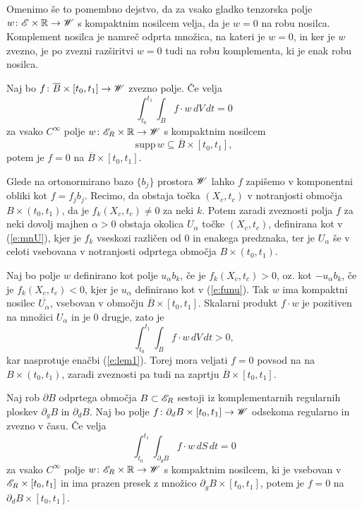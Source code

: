 Omenimo še to pomembno dejstvo, da za vsako gladko tenzorska polje $w\colon\mathscr E\times\mathbb R\to\mathscr W$ s kompaktnim
nosilcem velja, da je $w=0$ na robu nosilca. Komplement nosilca je namreč odprta množica, na kateri
je $w=0$, in ker je $w$ zvezno, je po zvezni razširitvi $w=0$ tudi na robu komplementa, ki je enak
robu nosilca.

\begin{lema}\label{l:1}
	Naj bo $f\colon\overline{B}\times [t_0,t_1]\to\mathscr W$ zvezno polje. Če velja
	\begin{equation}\label{e:lem1}
		\int_{t_0}^{t_1}\int_B f\cdot w\,dV\,dt = 0
	\end{equation}
	za vsako $C^{\infty}$ polje $w\colon\mathscr E_R\times\mathbb R\to\mathscr W$ s kompaktnim nosilcem
	\[ \mathrm{supp}\, w\subseteq \overline{B}\times[t_0,t_1], \]
	potem je $f=0$ na $\overline{B}\times [t_0,t_1]$.
\end{lema}

\proof
	Glede na ortonormirano bazo $\{b_j\}$ prostora $\mathscr W$ lahko $f$ zapišemo v komponentni obliki kot $f=f_jb_j$.
	Recimo, da obstaja točka $(X_c,t_c)$ v notranjosti območja $B\times(t_0,t_1)$, da je $f_{k}(X_c,t_c)\neq 0$
	za neki $k$. Potem zaradi zveznosti polja $f$ za neki dovolj majhen
	$\alpha > 0$ obstaja okolica $U_{\alpha}$ točke $(X_c,t_c)$, definirana kot v (\ref{e:mnU}), kjer je $f_k$
	vseskozi različen od 0 in enakega predznaka, ter
	je $U_{\alpha}$ še v celoti vsebovana v notranjosti odprtega območja $B\times(t_0,t_1)$.
	
	Naj bo polje
	$w$ definirano kot polje $u_{\alpha}b_k$, če je $f_{k}(X_c,t_c) > 0$, oz. kot $-u_{\alpha}b_k$,
	če je $f_{k}(X_c,t_c) < 0$, kjer je $u_{\alpha}$ definirano kot v (\ref{e:funu}). Tak $w$ ima
	kompaktni nosilec $\overline{U_{\alpha}}$, vsebovan v območju $\overline{B}\times[t_0,t_1]$.
	Skalarni produkt $f\cdot w$ je pozitiven na množici $U_{\alpha}$ in je 0 drugje, zato je
	\[ \int_{t_0}^{t_1}\int_B f\cdot w\,dV\,dt > 0, \]
	kar nasprotuje enačbi (\ref{e:lem1}). Torej mora veljati $f=0$ povsod na na $B\times (t_0,t_1)$,
	zaradi zveznosti pa tudi na zaprtju $\overline{B}\times [t_0,t_1]$.
\endproof

\begin{lema}\label{l:2}
	Naj rob $\partial B$ odprtega območja $B\subset\mathscr E_R$ sestoji iz komplementarnih regularnih ploskev
	$\partial_g B$ in $\partial_d B$. Naj bo polje $f\colon \partial_d B\times[t_0,t_1]\to \mathscr W$ odsekoma
	regularno in zvezno v času. Če velja
	\begin{equation}\label{e:lem2}
		\int_{t_0}^{t_1}\int_{\partial_d B} f\cdot w\,dS\,dt = 0
	\end{equation}
	za vsako $C^{\infty}$ polje $w\colon\mathscr E_R\times\mathbb R\to\mathscr W$ s kompaktnim nosilcem,
	ki je vsebovan v $\mathscr E_R\times[t_0,t_1]$ in ima prazen presek z množico $\partial_g B\times [t_0,t_1]$,
	potem je $f=0$ na $\partial_d B\times [t_0,t_1]$.
\end{lema}

